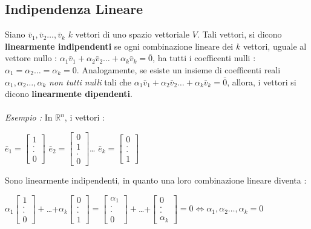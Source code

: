 \documentclass[12pt, letterpaper]{article}
\newcommand{\R}{{\mathbb R}}
\newcommand{\acc}{\\\hphantom{}\\}
\begin{document}
\subsection{Indipendenza Lineare}
Siano \(\bar v_1,\bar v_2\dots,\bar v_k\) \(k\) vettori di uno spazio vettoriale \(V\).
Tali vettori, si dicono \textbf{linearmente indipendenti} se ogni combinazione lineare
 dei \(k\) vettori, uguale al vettore nullo : \(\alpha_1\bar v_1+\alpha_2\bar v_2\dots+\alpha_k\bar v_k=\bar 0\),
 ha tutti i coefficenti nulli : \(\alpha_1=\alpha_2\dots=\alpha_k=0\). Analogamente, se esiste 
 un insieme di coefficenti reali \(\alpha_1,\alpha_2\dots,\alpha_k\) \textit{non tutti nulli} tali 
 che \(\alpha_1\bar v_1+\alpha_2\bar v_2\dots+\alpha_k\bar v_k=\bar 0\), allora, i vettori si dicono 
 \textbf{linearmente dipendenti}.\acc 
 \textit{Esempio :} In \(\R^n\), i vettori : \begin{center}
    \(\bar e_1 = \begin{bmatrix}
        1\\.\\.\\0
    \end{bmatrix}\) 
    \(\bar e_2 = \begin{bmatrix}
        0\\1\\.\\0
    \end{bmatrix}\)\dots
    \(\bar e_k = \begin{bmatrix}
        0\\.\\.\\1
    \end{bmatrix}\)
 \end{center}
 Sono linearmente indipendenti, in quanto una loro combinazione lineare diventa : \begin{center}
    \(
    \alpha_1 \begin{bmatrix}
        1\\.\\.\\0
    \end{bmatrix}+    
    \)\dots+\( \alpha_k\begin{bmatrix}
        0\\.\\.\\1
    \end{bmatrix}= \begin{bmatrix}
        \alpha_1\\.\\.\\0
    \end{bmatrix}+    
    \)\dots+\( \begin{bmatrix}
        0\\.\\.\\\alpha_k
    \end{bmatrix}=0\iff \alpha_1,\alpha_2\dots,\alpha_k=0\)
 \end{center}
\end{document}
